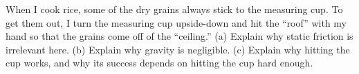  When I cook rice, some of the dry grains always stick to the
measuring cup. To get them out, I turn the measuring cup upside-down and hit the
``roof'' with my hand so that the grains come off of the ``ceiling.''
(a) Explain why static friction is irrelevant here.
(b) Explain why gravity is negligible.
(c) Explain why hitting the cup works, and why its success depends on
hitting the cup hard enough.
